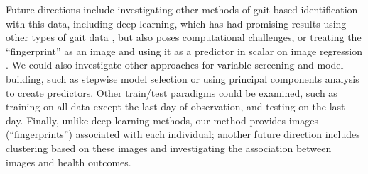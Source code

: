 Future directions include investigating other methods of gait-based identification with this data, including deep learning, which has had promising results using other types of gait data \citep{deep_learning}, but also poses computational challenges, or treating the ``fingerprint'' as an image and using it as a predictor in scalar on image regression \citep{soir}. We could also investigate other approaches for variable screening and model-building, such as stepwise model selection or using principal components analysis to create predictors. Other train/test paradigms could be examined, such as training on all data except the last day of observation, and testing on the last day. Finally, unlike deep learning methods, our method provides images (``fingerprints'') associated with each individual; another future direction includes clustering based on these images and investigating the association between images and health outcomes. 
